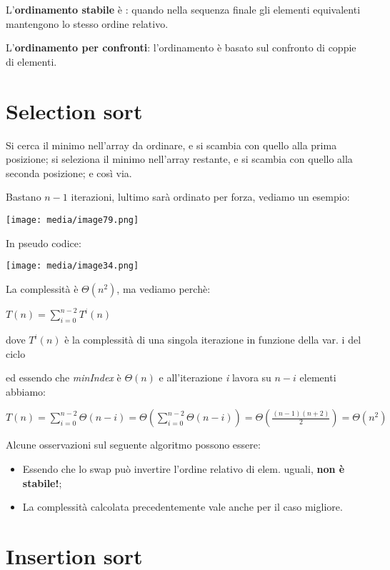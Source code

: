 L'\textbf{ordinamento stabile} è : quando nella sequenza finale gli
elementi equivalenti mantengono lo stesso ordine relativo.

L'\textbf{ordinamento per confronti}: l'ordinamento è basato sul
confronto di coppie di elementi.

\section{Selection sort}\label{selection-sort}

Si cerca il minimo nell'array da ordinare, e si scambia con quello alla
prima posizione; si seleziona il minimo nell'array restante, e si
scambia con quello alla seconda posizione; e così via.

Bastano \(n - 1\) iterazioni, l\textquotesingle ultimo sarà ordinato per
forza, vediamo un esempio:

\texttt{[image: media/image79.png]}

In pseudo codice:

\texttt{[image: media/image34.png]}

La complessità è \(\Theta(n^{2})\), ma vediamo perchè:

\(T(n) = \sum_{i = 0}^{n - 2}T^{i}(n)\)

dove \(T^{i}(n)\) è la complessità di una singola iterazione in funzione
della var. i del ciclo

ed essendo che \emph{minIndex} è \(\Theta(n)\) e all'iterazione \emph{i}
lavora su \(n - i\) elementi abbiamo:

\(T(n) = \sum_{i = 0}^{n - 2}\Theta(n - i) = \Theta(\sum_{i = 0}^{n - 2}\Theta(n - i)) = \Theta(\frac{(n - 1)(n + 2)}{2}) = \Theta(n^{2})\)

Alcune osservazioni sul seguente algoritmo possono essere:

\begin{itemize}
\item
  Essendo che lo swap può invertire l'ordine relativo di elem. uguali,
  \textbf{non è stabile!};
\item
  La complessità calcolata precedentemente vale anche per il caso
  migliore.
\end{itemize}

\section{Insertion sort}\label{insertion-sort}

